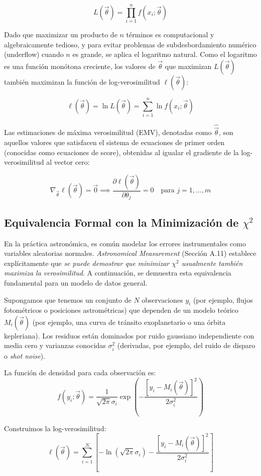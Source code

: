 $$ L(\vec{\theta}) = \prod_{i=1}^{n} f(x_i; \vec{\theta}) $$

Dado que maximizar un producto de $n$ términos es computacional y algebraicamente tedioso, y para evitar problemas de subdesbordamiento numérico (underflow) cuando $n$ es grande, se aplica el logaritmo natural. Como el logaritmo es una función monótona creciente, los valores de $\vec{\theta}$ que maximizan $L(\vec{\theta})$ también maximizan la función de log-verosimilitud $\ell(\vec{\theta})$:

$$ \ell(\vec{\theta}) = \ln L(\vec{\theta}) = \sum_{i=1}^{n} \ln f(x_i; \vec{\theta}) $$

Las estimaciones de máxima verosimilitud (EMV), denotadas como $\hat{\vec{\theta}}$, son aquellos valores que satisfacen el sistema de ecuaciones de primer orden (conocidas como ecuaciones de score), obtenidas al igualar el gradiente de la log-verosimilitud al vector cero:

$$ \nabla_{\vec{\theta}} \ell(\vec{\theta}) = \vec{0} \implies \frac{\partial \ell(\vec{\theta})}{\partial \theta_j} = 0 \quad \text{para } j = 1, \dots, m $$

\subsection{Equivalencia Formal con la Minimización de $\chi^2$}

En la práctica astronómica, es común modelar los errores instrumentales como variables aleatorias normales. \textit{Astronomical Measurement} (Sección A.11) establece explícitamente que \textit{se puede demostrar que minimizar $\chi^2$ usualmente también maximiza la verosimilitud}. A continuación, se demuestra esta equivalencia fundamental para un modelo de datos general.

Supongamos que tenemos un conjunto de $N$ observaciones $y_i$ (por ejemplo, flujos fotométricos o posiciones astrométricas) que dependen de un modelo teórico $M_i(\vec{\theta})$ (por ejemplo, una curva de tránsito exoplanetario o una órbita kepleriana). Los residuos están dominados por ruido gaussiano independiente con media cero y varianzas conocidas $\sigma_i^2$ (derivadas, por ejemplo, del ruido de disparo o \textit{shot noise}).

La función de densidad para cada observación es:
$$ f(y_i; \vec{\theta}) = \frac{1}{\sqrt{2\pi}\sigma_i} \exp\left( -\frac{[y_i - M_i(\vec{\theta})]^2}{2\sigma_i^2} \right) $$

Construimos la log-verosimilitud:
$$ \ell(\vec{\theta}) = \sum_{i=1}^{N} \left[ -\ln(\sqrt{2\pi}\sigma_i) - \frac{[y_i - M_i(\vec{\theta})]^2}{2\sigma_i^2} \right] $$

